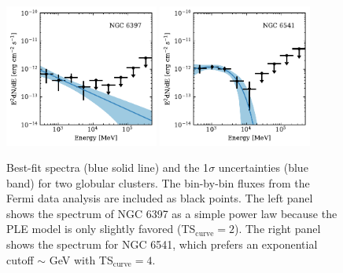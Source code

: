 \documentclass[doublespace,nopageskip]{VTthesis}
\begin{document}
\begin{figure}[htb]
    \centering
    \includegraphics[width=0.45\textwidth]{Figures/Globular/spectra/PL_spectrum_16.pdf}
    \includegraphics[width=0.45\textwidth]{Figures/Globular/spectra/PLE_spectrum_21.pdf}
    \caption{Best-fit spectra (blue solid line) and the 1$\sigma$ uncertainties (blue band) for two globular clusters. The bin-by-bin fluxes from the Fermi data analysis are included as black points. The left panel shows the spectrum of NGC 6397 as a simple power law because the PLE model is only slightly favored (TS$_\mathrm{curve} = 2$). The right panel shows the spectrum for NGC 6541, which prefers an exponential cutoff $\sim$ GeV with TS$_\mathrm{curve} = 4$.}
    \label{fig:spectra_example}
\end{figure}
\end{document}
